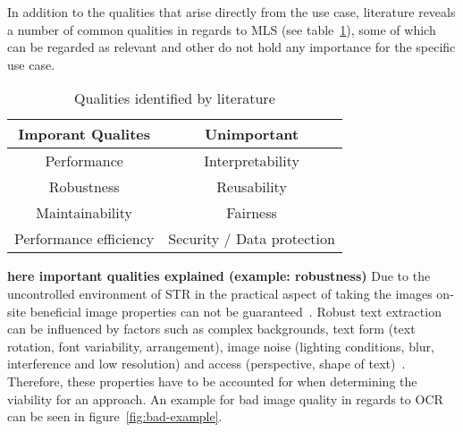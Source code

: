In addition to the qualities that arise directly from the use case, literature reveals a number of
common qualities in regards to \ac{MLS} (see table~\ref{tb:literatureQualities}), some of which
can be regarded as relevant and other do not hold any importance for the specific use case.
\begin{table}[h]\label{tb:literatureQualities}
    \centering
    \begin{tabular}{c c}
        Imporant Qualites & Unimportant \\
        \hline
        Performance & Interpretability \\
        Robustness & Reusability \\
        Maintainability & Fairness \\
        Performance efficiency & Security / Data protection \\
    \end{tabular}
    \caption{Qualities identified by literature}
\end{table}
\textbf{here important qualities explained (example: robustness)}
Due to the uncontrolled environment of \ac{STR} in the practical aspect of taking the images on-site
beneficial image properties can not be guaranteed~\citep{chen_text_2021}.
Robust text extraction can be influenced by factors such as complex backgrounds, text form
(text rotation, font variability, arrangement), image noise (lighting conditions, blur,
interference and low resolution) and access (perspective, shape of
text)~\citep{oyedotun_deep_2015,ghosh_visual_2017,chen_text_2021}.
Therefore, these properties have to be accounted for when determining the viability for an approach.
An example for bad image quality in regards to \ac{OCR} can be seen in figure~\ref{fig:bad-example}.
